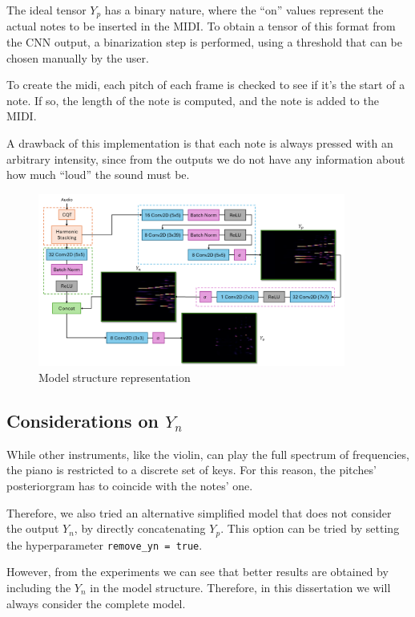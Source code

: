 \documentclass[10pt,twocolumn,letterpaper]{article}
\begin{document}
The ideal tensor $Y_p$ has a binary nature, where the ``on'' values represent the actual notes to be inserted in the MIDI. To obtain a tensor of this format from the CNN output, a binarization step is performed, using a threshold that can be chosen manually by the user.

To create the midi, each pitch of each frame is checked to see if it's the start of a note. If so, the length of the note is computed, and the note is added to the MIDI.

A drawback of this implementation is that each note is always pressed with an arbitrary intensity, since from the outputs we do not have any information about how much ``loud'' the sound must be.

\begin{figure}[ht]
    \begin{center}
        \includegraphics[width=0.9\textwidth]{"images/model-structure.png"}
    \end{center}
    \caption{Model structure representation}
    \label{fig:model-structure}
\end{figure}

\subsection{Considerations on $Y_n$}

While other instruments, like the violin, can play the full spectrum of frequencies, the piano is restricted to a discrete set of keys. For this reason, the pitches' posteriorgram has to coincide with the notes' one.

Therefore, we also tried an alternative simplified model that does not consider the output $Y_n$, by directly concatenating $Y_p$. This option can be tried by setting the hyperparameter \texttt{remove\_yn = true}.

However, from the experiments we can see that better results are obtained by including the $Y_n$ in the model structure. Therefore, in this dissertation we will always consider the complete model.
\end{document}
